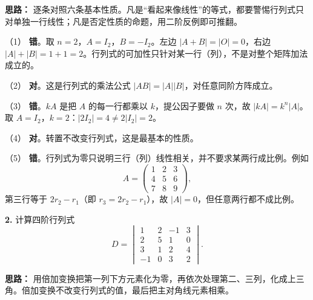 \ifshowsolutions%
\textbf{思路：} 逐条对照六条基本性质。凡是“看起来像线性”的等式，都要警惕行列式只对单独一行线性；凡是否定性质的命题，用二阶反例即可推翻。

（1） \textbf{错}。取 $n=2$，$A=I_2$，$B=-I_2$。左边 $|A+B|=|O|=0$，右边 $|A|+|B|=1+1=2$。行列式的可加性只针对某一行（列），不是对整个矩阵加法成立的。

（2） \textbf{对}。这是行列式的乘法公式 $|AB|=|A||B|$，对任意同阶方阵成立。

（3） \textbf{错}。$kA$ 是把 $A$ 的每一行都乘以 $k$，提公因子要做 $n$ 次，故 $|kA|=k^{n}|A|$。取 $A=I_2$，$k=2$：$|2I_2|=4\neq 2|I_2|=2$。

（4） \textbf{对}。转置不改变行列式，这是最基本的性质。

（5） \textbf{错}。行列式为零只说明三行（列）线性相关，并不要求某两行成比例。例如
\[
A=\begin{pmatrix}1&2&3\\4&5&6\\7&8&9\end{pmatrix},
\]
第三行等于 $2r_2-r_1$（即 $r_3=2r_2-r_1$），故 $|A|=0$，但任意两行都不成比例。


\else \answerarea[6] \fi%

\textbf{2.} 计算四阶行列式
\[
D=\begin{vmatrix}
1&2&-1&3\\
2&5&1&0\\
3&1&2&4\\
-1&0&3&2
\end{vmatrix}.
\]

\ifshowsolutions%
\textbf{思路：} 用倍加变换把第一列下方元素化为零，再依次处理第二、三列，化成上三角。倍加变换不改变行列式的值，最后把主对角线元素相乘。

